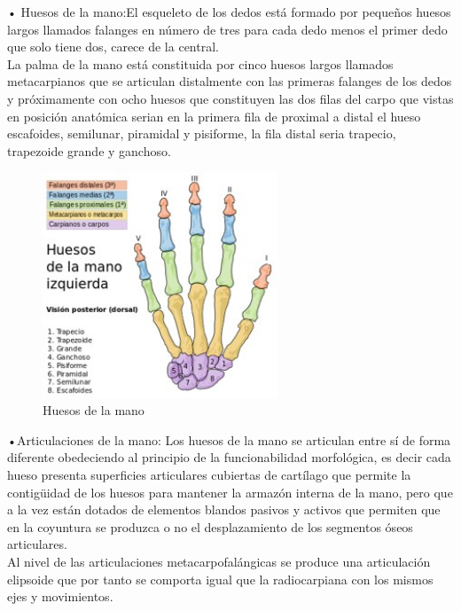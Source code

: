 \documentclass{article}
\begin{document}
\begin{description}
\item •	Huesos de la mano:El esqueleto de los dedos está formado por pequeños huesos largos llamados falanges en número de tres para cada dedo menos el primer dedo que solo tiene dos, carece de la central.\\ La palma de la mano está constituida por cinco huesos largos llamados metacarpianos que se articulan distalmente con las primeras falanges de los dedos y próximamente con ocho huesos que constituyen las dos filas del carpo que vistas en posición anatómica serian en la primera fila de proximal a distal el hueso escafoides, semilunar, piramidal y pisiforme, la fila distal seria trapecio, trapezoide grande y ganchoso.\\

\begin{figure} [htp]%
    \centering
    \includegraphics[width=70mm]{biomecanica3.jpg} %
    \caption{Huesos de la mano}
    \label{grafica}
\end{figure}

\item •Articulaciones de la mano:  Los huesos de la mano se articulan entre sí de forma diferente obedeciendo al principio de la funcionabilidad morfológica, es decir cada hueso presenta superficies articulares cubiertas de cartílago que permite la contigüidad de los huesos para mantener la armazón interna de la mano, pero que a la vez están dotados de elementos blandos pasivos y activos que permiten que en la coyuntura se produzca o no el desplazamiento de los segmentos óseos articulares.\\ Al nivel de las articulaciones metacarpofalángicas se produce una articulación elipsoide que por tanto se comporta igual que la radiocarpiana con los mismos ejes y movimientos.\\


\end{description}
\end{document}
